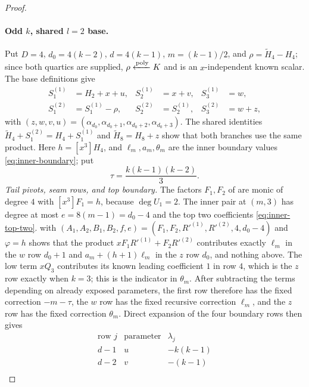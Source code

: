 \begin{proof}
      \paragraph{Odd $k$, shared $l=2$ base.}
      Put $D=4$, $d_0=4(k-2)$, $d=4(k-1)$, $m=(k-1)/2$, and
      $\rho=\widetilde H_4-H_4$; since both quartics are supplied,
      $\rho\mathrel{\xleftarrow{\mathrm{poly}}} K$ and is an $x$-independent known scalar.
      The base definitions give
      \[
      \begin{aligned}
        S^{(1)}_1&=H_2+x+u,&
        S^{(1)}_2&=x+v,&
        S^{(1)}_3&=w,\\
        S^{(2)}_1&=S^{(1)}_1-\rho,&
        S^{(2)}_2&=S^{(1)}_2,&
        S^{(2)}_3&=w+z,
      \end{aligned}
      \]
      with $(z,w,v,u)=(\alpha_{d_0},\alpha_{d_0+1},
      \alpha_{d_0+2},\alpha_{d_0+3})$.  The shared identities
      $\widetilde H_4+S^{(2)}_1=H_4+S^{(1)}_1$ and
      $\widetilde H_8=H_8+z$ show that both branches use the same product.
      Here $h=[x^3]H_4$, and $\ell_m,a_m,\theta_m$ are the inner boundary
      values \eqref{eq:inner-boundary}; put
      \[
        \tau=\frac{k(k-1)(k-2)}3 .
      \]
      \smallskip\noindent\emph{Tail pivots, seam rows, and top boundary.}
      The factors $F_1,F_2$ of  are monic of
      degree $4$ with $[x^3]F_1=h$, because $\deg U_1=2$.  The inner pair
      at $(m,3)$ has degree at most $e=8(m-1)=d_0-4$ and the top two
      coefficients \eqref{eq:inner-top-two}.  
      with $(A_1,A_2,B_1,B_2,f,e)=(F_1,F_2,R'^{(1)},R'^{(2)},4,d_0-4)$ and
      $\varphi=h$ shows that the product $xF_1R'^{(1)}+F_2R'^{(2)}$
      contributes exactly $\ell_m$ in the $w$ row $d_0+1$ and
      $a_m+(h+1)\ell_m$ in the $z$ row $d_0$, and nothing above.  The low
      term $xQ_3$ contributes its known leading coefficient $1$ in row $4$,
      which is the $z$ row exactly when $k=3$; this is the indicator in
      $\theta_m$.
      After subtracting the terms depending on already exposed parameters,
      the first row therefore has the fixed correction $-m-\tau$, the $w$
      row has the fixed recursive correction $\ell_m$, and the $z$ row has
      the fixed correction $\theta_m$.  Direct expansion of the four
      boundary rows then gives
      \[
      \begin{array}{c|c|c}
        \text{row }j&\text{parameter}&\lambda_j\\ \hline
        d-1&u&-k(k-1)\\
        d-2&v&-(k-1)\\

\end{array}\]
\end{proof}
